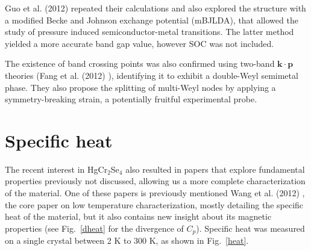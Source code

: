 \documentclass[preprint,pre,floats,aps,amsmath,amssymb]{revtex4}
\begin{document}
Guo et al. (2012) \cite{guo} repeated their calculations and also explored the structure with a modified Becke and Johnson exchange potential (mBJLDA), that allowed the study of pressure induced semiconductor-metal transitions. The latter method yielded a more accurate band gap value, however SOC was not included.

The existence of band crossing points was also confirmed using two-band $\bm{k} \cdot \bm{p}$ theories (Fang et al. (2012) \cite{fang}), identifying it to exhibit a double-Weyl semimetal phase. They also propose the splitting of multi-Weyl nodes by applying a symmetry-breaking strain, a potentially fruitful experimental probe.


\section{Specific heat}

The recent interest in HgCr$_2$Se$_4$ also resulted in papers that explore fundamental properties previously not discussed, allowing us a more complete characterization of the material. One of these papers is previously mentioned Wang et al. (2012) \cite{wang}, the core paper on low temperature characterization, mostly detailing the specific heat of the material, but it also contains new insight about its magnetic properties (see Fig.~\ref{dheat} for the divergence of $C_p$). Specific heat was measured on a single crystal between 2 K to 300 K, as shown in Fig.~\ref{heat}. \\
\end{document}
